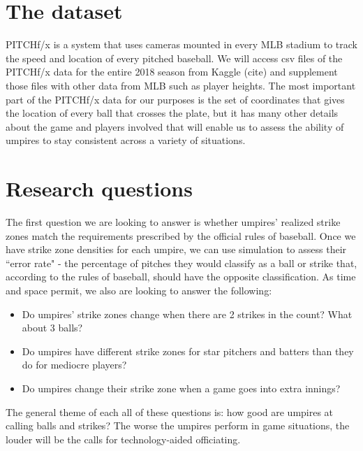 \documentclass[bj, preprint]{imsart}
\begin{document}
\section{The dataset}\label{sec:dataset}
PITCHf/x is a system that uses cameras mounted in every MLB stadium to track the speed and location of every pitched baseball. 
We will access csv files of the PITCHf/x data for the entire 2018 season from Kaggle (cite) and supplement those files with other data from MLB such as player heights. 
The most important part of the PITCHf/x data for our purposes is the set of coordinates that gives the location of every ball that crosses the plate, but it has many other details about the game and players involved that will enable us to assess the ability of umpires to stay consistent across a variety of situations.

\section{Research questions}\label{sec:research}
The first question we are looking to answer is whether umpires' realized strike zones match the requirements prescribed by the official rules of baseball. 
Once we have strike zone densities for each umpire, we can use simulation to assess their ``error rate" - the percentage of pitches they would classify as a ball or strike that, according to the rules of baseball, should have the opposite classification.
As time and space permit, we also are looking to answer the following:
\begin{itemize}
\item Do umpires' strike zones change when there are 2 strikes in the count? What about 3 balls?
\item Do umpires have different strike zones for star pitchers and batters than they do for mediocre players?
\item Do umpires change their strike zone when a game goes into extra innings?
\end{itemize}
The general theme of each all of these questions is: how good are umpires at calling balls and strikes? 
The worse the umpires perform in game situations, the louder will be the calls for technology-aided officiating.

\end{document}
